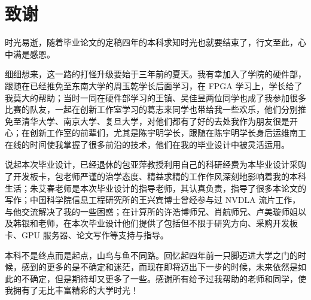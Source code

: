 \chapter[致谢]{致\quad 谢}%
\thispagestyle{noheaderstyle}%

时光易逝，随着毕业论文的定稿四年的本科求知时光也就要结束了，行文至此，心中满是感恩。

细细想来，这一路的打怪升级要始于三年前的夏天。我有幸加入了学院的硬件部，跟随在已经推免至东南大学的周玉乾学长后面学习，在 FPGA 学习上，学长给了我莫大的帮助；当时一同在硬件部学习的王镇、吴佳昱两位同学也成了我参加很多比赛的队友，一起在创新工作室学习的葛志来同学也带给我一些欢乐，他们分别推免至清华大学、南京大学、复旦大学，对他们都有了好的去处我作为朋友很是开心；在创新工作室的前辈们，尤其是陈宇明学长，跟随在陈宇明学长身后运维南工在线的时间使我掌握了很多前沿的技术，他们在我的毕业设计中被灵活运用。

说起本次毕业设计，已经退休的包亚萍教授利用自己的科研经费为本毕业设计采购了开发板卡，包老师严谨的治学态度、精益求精的工作作风深刻地影响着我的本科生活；朱艾春老师是本次毕业设计的指导老师，其认真负责，指导了很多本论文的写作；中国科学院信息工程研究所的王兴宾博士曾经参与过 NVDLA 流片工作，与他交流解决了我的一些困惑；在计算所的许浩博师兄、肖航师兄、卢美璇师姐以及韩银和老师，在本次毕业设计他们提供了包括但不限于研究方向、采购开发板卡、GPU 服务器、论文写作等支持与指导。

本科不是终点而是起点，山鸟与鱼不同路。回忆起四年前一只脚迈进大学之门的时候，感到的更多的是不确定和迷茫，而现在即将迈出下一步的时候，未来依然是如此的不确定，但是期待却又更多了一些。感谢所有给予过我帮助的老师和同学，使我拥有了无比丰富精彩的大学时光！

\cleardoublepage[plain]%
